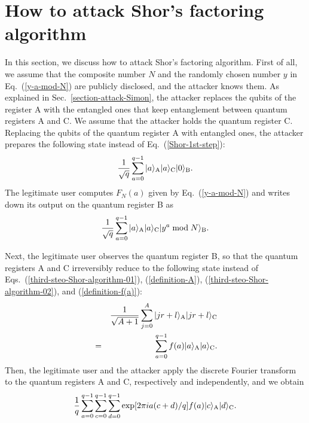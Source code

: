 \documentclass[12pt]{article}
\begin{document}
\section{\label{section-attack-Shor}How to attack Shor's factoring algorithm}
In this section,
we discuss how to attack Shor's factoring algorithm.
First of all,
we assume that the composite number $N$ and the randomly chosen number $y$ in Eq.~(\ref{y-a-mod-N})
are publicly disclosed,
and the attacker knows them.
As explained in Sec.~\ref{section-attack-Simon},
the attacker replaces the qubits of the register A with the entangled ones that keep entanglement between quantum registers A and C.
We assume that the attacker holds the quantum register C.
Replacing the qubits of the quantum register A with entangled ones,
the attacker prepares the following state instead of Eq.~(\ref{Shor-1st-step}):
\begin{equation}
\frac{1}{\sqrt{q}}
\sum_{a=0}^{q-1}
|a\rangle_{\mbox{\scriptsize A}}
|a\rangle_{\mbox{\scriptsize C}}
|0\rangle_{\mbox{\scriptsize B}}.
\end{equation}
The legitimate user computes $F_{N}(a)$ given by Eq.~(\ref{y-a-mod-N}) and writes down its output on the quantum register B as
\begin{equation}
\frac{1}{\sqrt{q}}
\sum_{a=0}^{q-1}
|a\rangle_{\mbox{\scriptsize A}}
|a\rangle_{\mbox{\scriptsize C}}
|y^{a} \bmod N\rangle_{\mbox{\scriptsize B}}.
\end{equation}

Next,
the legitimate user observes the quantum register B, so that the quantum registers A and C irreversibly reduce to the following state
instead of Eqs.~(\ref{third-steo-Shor-algorithm-01}), (\ref{definition-A}), (\ref{third-steo-Shor-algorithm-02}), and (\ref{definition-f(a)}):
\begin{eqnarray}
&&
\frac{1}{\sqrt{A+1}}
\sum_{j=0}^{A}
|jr+l\rangle_{\mbox{\scriptsize A}}
|jr+l\rangle_{\mbox{\scriptsize C}} \nonumber \\
&=&
\sum_{a=0}^{q-1}
f(a)
|a\rangle_{\mbox{\scriptsize A}}
|a\rangle_{\mbox{\scriptsize C}}.
\end{eqnarray}
Then,
the legitimate user and the attacker apply the discrete Fourier transform to the quantum registers A and C,
respectively and independently,
and we obtain
\begin{equation}
\frac{1}{q}
\sum_{a=0}^{q-1}
\sum_{c=0}^{q-1}
\sum_{d=0}^{q-1}
\exp[2\pi ia(c+d)/q]f(a)
|c\rangle_{\mbox{\scriptsize A}}
|d\rangle_{\mbox{\scriptsize C}}.
\end{equation}
\end{document}
